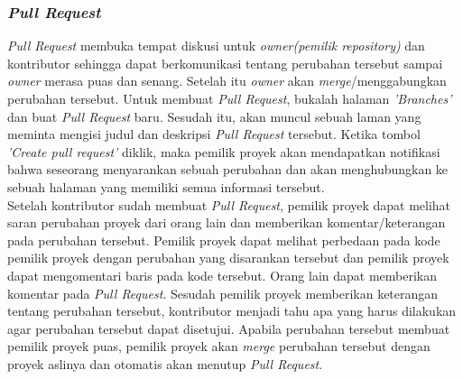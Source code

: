 \subsubsection{\textit{Pull Request}}
\textit{Pull Request} membuka tempat diskusi untuk \textit{owner(pemilik repository)} dan kontributor sehingga dapat berkomunikasi tentang perubahan tersebut sampai \textit{owner} merasa puas dan senang. Setelah itu \textit{owner} akan \textit{merge}/menggabungkan perubahan tersebut. Untuk membuat \textit{Pull Request}, bukalah halaman \textit{'Branches'} dan buat \textit{Pull Request} baru. Sesudah itu, akan muncul sebuah laman yang meminta mengisi judul dan deskripsi \textit{Pull Request} tersebut. Ketika tombol \textit{'Create pull request'} diklik, maka pemilik proyek akan mendapatkan notifikasi bahwa seseorang menyarankan sebuah perubahan dan akan menghubungkan ke sebuah halaman yang memiliki semua informasi tersebut.\\ 

Setelah kontributor sudah membuat \textit{Pull Request}, pemilik proyek dapat melihat saran perubahan proyek dari orang lain dan memberikan komentar/keterangan pada perubahan tersebut. Pemilik proyek dapat melihat perbedaan pada kode pemilik proyek dengan perubahan yang disarankan tersebut dan pemilik proyek dapat mengomentari baris pada kode tersebut. Orang lain dapat memberikan komentar pada \textit{Pull Request}. Sesudah pemilik proyek memberikan keterangan tentang perubahan tersebut, kontributor menjadi tahu apa yang harus dilakukan agar perubahan tersebut dapat disetujui. Apabila perubahan tersebut membuat pemilik proyek puas, pemilik proyek akan \textit{merge} perubahan tersebut dengan proyek aslinya dan otomatis akan menutup \textit{Pull Request}.\\ 